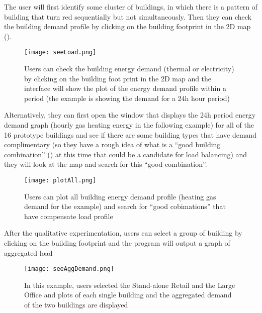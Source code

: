\begin{itemize}
  The user will first identify some cluster of buildings, in which
  there is a pattern of building that turn red sequentially but not
  simultaneously. Then they can check the building demand profile by
  clicking on the building footprint in the 2D map
  ().

  \begin{figure}[h!]
    \centering
    \texttt{[image: seeLoad.png]}
    \caption[Check Heating Load]{Users can check the building energy
      demand (thermal or electricity) by clicking on the building foot
      print in the 2D map and the interface will show the plot of the
      energy demand profile within a period (the example is showing
      the demand for a 24h hour period)}
    \label{fig:seeLoad}
  \end{figure}

  Alternatively, they can first open the window that displays the 24h
  period energy demand graph (hourly gas heating energy in the
  following example) for all of the 16 prototype buildings and see if
  there are some building types that have demand complimentary (so
  they have a rough idea of what is a ``good building combination''
  () at this time that could be a candidate for load
  balancing) and they will look at the map and search for this ``good
  combination''.

  \begin{figure}[h!]
    \centering
    \texttt{[image: plotAll.png]}
    \caption[Check All Heating Load Plot]{Users can plot all building
      energy demand profile (heating gas demand for the example) and
      search for ``good cobimations'' that have compensate load
      profile}
    \label{fig:plotAll}
  \end{figure}

  After the qualitative experimentation, users can select a group of
  building by clicking on the building footprint and the program will
  output a graph of aggregated load

  \begin{figure}[h!]
    \centering
    \texttt{[image: seeAggDemand.png]}
    \caption[Plot Aggregated Demand]{In this example, users selected
      the Stand-alone Retail and the Large Office and plots of each
      single building and the aggregated demand of the two buildings
      are displayed}
    \label{fig:plotAll}
  \end{figure}

\end{itemize}

